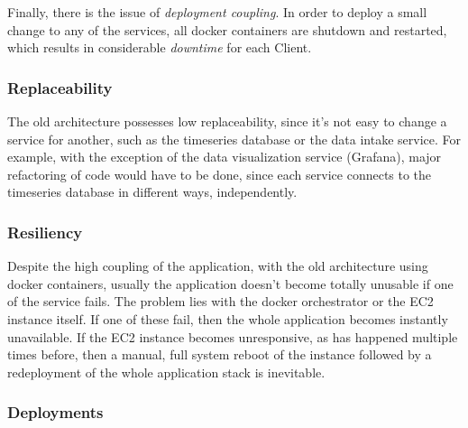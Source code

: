 Finally, there is the issue of \textit{deployment coupling}. In order to deploy a small change to any of the services, all docker containers are shutdown and restarted, which results in considerable \textit{downtime} for each Client.


\subsubsection{Replaceability}\label{methodology:sss:replaceability}

The old architecture possesses low replaceability, since it's not easy to change a service for another, such as the timeseries database or the data intake service. For example, with the exception of the data visualization service (Grafana), major refactoring of code would have to be done, since each service connects to the timeseries database in different ways, independently.

\subsubsection{Resiliency}\label{methodology:sss:resiliency}

Despite the high coupling of the application, with the old architecture using docker containers, usually the application doesn't become totally unusable if one of the service fails. The problem lies with the docker orchestrator or the EC2 instance itself. If one of these fail, then the whole application becomes instantly unavailable. If the EC2 instance becomes unresponsive, as has happened multiple times before, then a manual, full system reboot of the instance followed by a redeployment of the whole application stack is inevitable. 

\subsubsection{Deployments}\label{methodology:sss:deployments}

